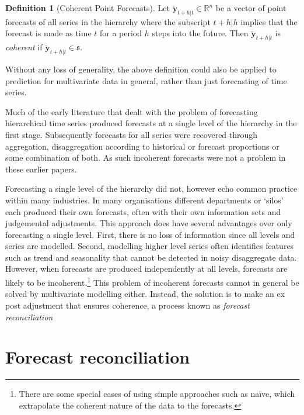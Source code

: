 \documentclass[12pt]{article}
\theoremstyle{definition}
\newtheorem{definition}{Definition}[section]
\theoremstyle{property}
\begin{document}
	\begin{definition}[Coherent Point Forecasts]\label{def:cohpoint}
        Let $\breve{\bm{y}}_{t+h|t} \in \mathbb{R}^n$ be a vector of point forecasts of all series in the hierarchy where the subscript $t+h|h$ implies that the forecast is made as time $t$ for a period $h$ steps into the future. Then $\breve{\bm{y}}_{t+h|t}$ is \emph{coherent} if $\breve{\bm{y}}_{t+h|t} \in \mathfrak{s}$.
	\end{definition}

    Without any loss of generality, the above definition could also be applied to prediction for multivariate data in general, rather than just forecasting of time series.


    Much of the early literature that dealt with the problem of forecasting hierarchical time series \citep[see][and references therein]{Gross1990} produced forecasts at a single level of the hierarchy in the first stage. Subsequently forecasts for all series were recovered through aggregation, disaggregation according to historical or forecast proportions or some combination of both.  As such incoherent forecasts were not a problem in these earlier papers.

    Forecasting a single level of the hierarchy did not, however echo common practice within many industries.  In many organisations different departments or `silos' each produced their own forecasts, often with their own information sets and judgemental adjustments.  This approach does have several advantages over only forecasting a single level.  First, there is no loss of information since all levels and series are modelled.  Second, modelling higher level series often identifies features such as trend and seasonality that cannot be detected in noisy disaggregate data.  However, when forecasts are produced independently at all levels, forecasts are likely to be incoherent.\footnote{There are some special cases of using simple approaches such as na\"{i}ve, which extrapolate the coherent nature of the data to the forecasts.} This problem of incoherent forecasts cannot in general be solved by multivariate modelling either.  Instead, the solution is to make an ex post adjustment that ensures coherence, a process known as {\em forecast reconciliation}
	
	
	
\section{Forecast reconciliation}\label{sec:Reconciliation}
	
\end{document}
